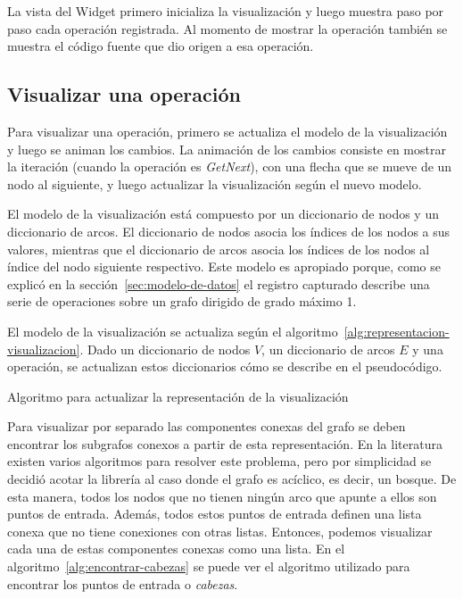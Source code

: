 La vista del Widget primero inicializa la visualización y luego muestra paso por paso cada operación registrada.  Al momento de mostrar la operación también se muestra el código fuente que dio origen a esa operación.

\subsection{Visualizar una operación}

Para visualizar una operación, primero se actualiza el modelo de la visualización y luego se animan los cambios. La animación de los cambios consiste en mostrar la iteración (cuando la operación es \textit{GetNext}), con una flecha que se mueve de un nodo al siguiente, y luego actualizar la visualización según el nuevo modelo.

El modelo de la visualización está compuesto por un diccionario de nodos y un diccionario de arcos. El diccionario de nodos asocia los índices de los nodos a sus valores, mientras que el diccionario de arcos asocia los índices de los nodos al índice del nodo siguiente respectivo. Este modelo es apropiado porque, como se explicó en la sección~\ref{sec:modelo-de-datos} el registro capturado describe una serie de operaciones sobre un grafo dirigido de grado máximo 1.

El modelo de la visualización se actualiza según el algoritmo~\ref{alg:representacion-visualizacion}. Dado un diccionario de nodos $V$, un diccionario de arcos $E$ y una operación, se actualizan estos diccionarios cómo se describe en el pseudocódigo.

\begin{algorithm}[htb]
  \caption{Algoritmo para actualizar la representación de la visualización}
  \label{alg:representacion-visualizacion}
  \begin{algorithmic}[1]
      \State {}
      \State {}
      \State {}
      \State {}
    \EndIf
  \EndFunction
  \end{algorithmic}
\end{algorithm}

Para visualizar por separado las componentes conexas del grafo se deben encontrar los subgrafos conexos a partir de esta representación. En la literatura existen varios algoritmos para resolver este problema, pero por simplicidad se decidió acotar la librería al caso donde el grafo es acíclico, es decir, un bosque. De esta manera, todos los nodos que no tienen ningún arco que apunte a ellos son puntos de entrada. Además, todos estos puntos de entrada definen una lista conexa que no tiene conexiones con otras listas. Entonces, podemos visualizar cada una de estas componentes conexas como una lista. En el algoritmo~\ref{alg:encontrar-cabezas} se puede ver el algoritmo utilizado para encontrar los puntos de entrada o \textit{cabezas}.

